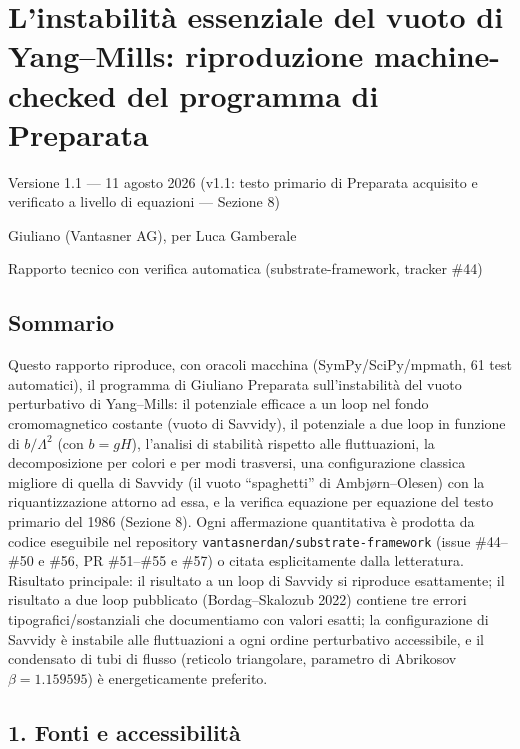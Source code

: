 \documentclass[
]{article}
\author{}
\date{}
\begin{document}
\hypertarget{linstabilituxe0-essenziale-del-vuoto-di-yangmills-riproduzione-machine-checked-del-programma-di-preparata}{%
\section{L'instabilità essenziale del vuoto di Yang--Mills: riproduzione
machine-checked del programma di
Preparata}\label{linstabilituxe0-essenziale-del-vuoto-di-yangmills-riproduzione-machine-checked-del-programma-di-preparata}}

Versione 1.1 --- 11 agosto 2026 (v1.1: testo primario di Preparata
acquisito e verificato a livello di equazioni --- Sezione 8)

Giuliano (Vantasner AG), per Luca Gamberale

Rapporto tecnico con verifica automatica (substrate-framework, tracker
\#44)

\hypertarget{sommario}{%
\subsection{Sommario}\label{sommario}}

Questo rapporto riproduce, con oracoli macchina (SymPy/SciPy/mpmath, 61
test automatici), il programma di Giuliano Preparata sull'instabilità
del vuoto perturbativo di Yang--Mills: il potenziale efficace a un loop
nel fondo cromomagnetico costante (vuoto di Savvidy), il potenziale a
due loop in funzione di \(b/\Lambda^2\) (con \(b = gH\)), l'analisi di
stabilità rispetto alle fluttuazioni, la decomposizione per colori e per
modi trasversi, una configurazione classica migliore di quella di
Savvidy (il vuoto ``spaghetti'' di Ambjørn--Olesen) con la
riquantizzazione attorno ad essa, e la verifica equazione per equazione
del testo primario del 1986 (Sezione 8). Ogni affermazione quantitativa
è prodotta da codice eseguibile nel repository
\texttt{vantasnerdan/substrate-framework} (issue \#44--\#50 e \#56, PR
\#51--\#55 e \#57) o citata esplicitamente dalla letteratura. Risultato
principale: il risultato a un loop di Savvidy si riproduce esattamente;
il risultato a due loop pubblicato (Bordag--Skalozub 2022) contiene tre
errori tipografici/sostanziali che documentiamo con valori esatti; la
configurazione di Savvidy è instabile alle fluttuazioni a ogni ordine
perturbativo accessibile, e il condensato di tubi di flusso (reticolo
triangolare, parametro di Abrikosov \(\beta = 1.159595\)) è
energeticamente preferito.

\hypertarget{fonti-e-accessibilituxe0}{%
\subsection{1. Fonti e accessibilità}\label{fonti-e-accessibilituxe0}}
\end{document}

